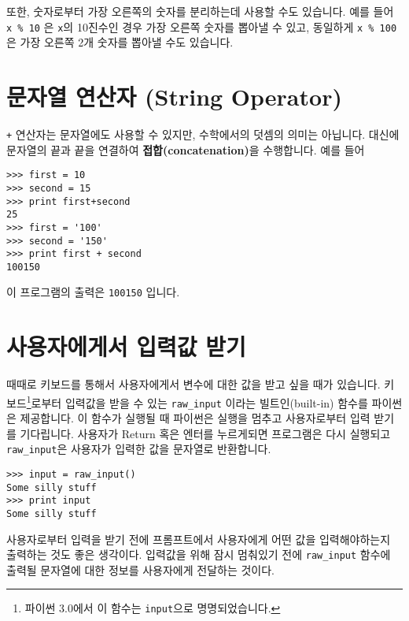 
또한, 숫자로부터 가장 오른쪽의 숫자를 분리하는데 사용할 수도 있습니다. 예를 들어 {\tt x \% 10} 은 {\tt x}의 10진수인 경우 가장 오른쪽 숫자를 뽑아낼 수 있고, 동일하게 {\tt x \% 100}은 가장 오른쪽 2개 숫자를 뽑아낼 수도 있습니다.

\section{문자열 연산자 (String Operator)}

{\tt +} 연산자는 문자열에도 사용할 수 있지만, 수학에서의 덧셈의 의미는 아닙니다. 대신에 문자열의 끝과 끝을 연결하여 {\bf 접합(concatenation)}을 수행합니다. 예를 들어


\beforeverb
\begin{verbatim}
>>> first = 10
>>> second = 15
>>> print first+second
25
>>> first = '100'
>>> second = '150'
>>> print first + second
100150
\end{verbatim}
\afterverb
%
이 프로그램의 출력은 {\tt 100150} 입니다.

\section{사용자에게서 입력값 받기}

때때로 키보드를 통해서 사용자에게서 변수에 대한 값을 받고 싶을 때가 있습니다. 키보드\footnote{파이썬 3.0에서 이 함수는 {\tt input}으로 명명되었습니다.}로부터 입력값을 받을 수 있는 \verb"raw_input" 이라는 빌트인(built-in) 함수를 파이썬은 제공합니다. 이 함수가 실행될 때 파이썬은 실행을 멈추고 사용자로부터 입력 받기를 기다립니다. 사용자가 {\sf Return} 혹은 {\sf 엔터}를 누르게되면 프로그램은 다시 실행되고 \verb"raw_input"은 사용자가 입력한 값을 문자열로 반환합니다.


\beforeverb
\begin{verbatim}
>>> input = raw_input()
Some silly stuff
>>> print input
Some silly stuff
\end{verbatim}
\afterverb
%
사용자로부터 입력을 받기 전에 프롬프트에서 사용자에게 어떤 값을 입력해야하는지 출력하는 것도 좋은 생각이다. 입력값을 위해 잠시 멈춰있기 전에 \verb"raw_input" 함수에 출력될 문자열에 대한 정보를 사용자에게 전달하는 것이다.


